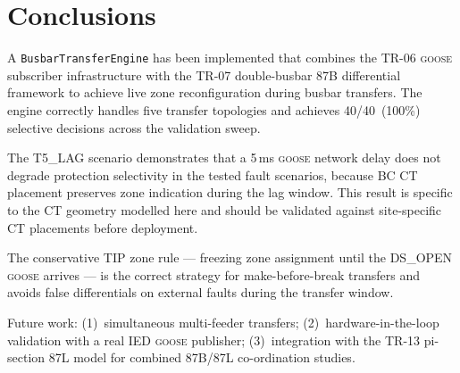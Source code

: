 \documentclass[11pt,a4paper]{article}
\newcommand{\goose}{\textsc{goose}}
\begin{document}
\section{Conclusions}
\label{sec:conclusions}

A \texttt{BusbarTransferEngine} has been implemented that combines the
TR-06 \goose{} subscriber infrastructure with the TR-07 double-busbar 87B
differential framework to achieve live zone reconfiguration during busbar
transfers.  The engine correctly handles five transfer topologies and
achieves 40/40~(100\%) selective decisions across the validation sweep.

The T5\_LAG scenario demonstrates that a 5\,ms \goose{} network delay does
not degrade protection selectivity in the tested fault scenarios, because BC
CT placement preserves zone indication during the lag window.  This result
is specific to the CT geometry modelled here and should be validated against
site-specific CT placements before deployment.

The conservative TIP zone rule --- freezing zone assignment until the
DS\_OPEN \goose{} arrives --- is the correct strategy for make-before-break
transfers and avoids false differentials on external faults during the
transfer window.

Future work: (1)~simultaneous multi-feeder transfers; (2)~hardware-in-the-loop
validation with a real IED \goose{} publisher; (3)~integration with the
TR-13 pi-section 87L model for combined 87B/87L co-ordination studies.



\end{document}
